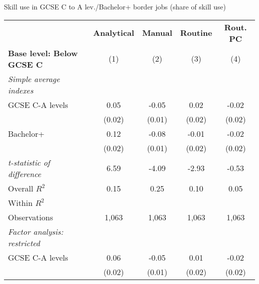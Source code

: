 \begin{center}
\begin{threeparttable}[!h]
\caption{Skill use in GCSE C to A lev./Bachelor+ border jobs (share of skill use)}
\label{tab:skillRegs}
\begin{tabular}{lcccc}
\toprule
\toprule
&\multicolumn{1}{c}{\textbf{Analytical}}&\multicolumn{1}{c}{\textbf{Manual}}&\multicolumn{1}{c}{\textbf{Routine}}&\multicolumn{1}{c}{\textbf{Rout. PC}} \\
\textbf{Base level: Below GCSE C}&\multicolumn{1}{c}{(1)}&\multicolumn{1}{c}{(2)}&\multicolumn{1}{c}{(3)}&\multicolumn{1}{c}{(4)} \\
\midrule
\textit{Simple average indexes}\vspace{1mm} \\ 
\hspace{3mm}GCSE C-A levels&        0.05\sym{**} &       -0.05\sym{***}&        0.02         &       -0.02         \\
                    &      (0.02)         &      (0.01)         &      (0.02)         &      (0.02)         \\
\hspace{3mm}Bachelor+&        0.12\sym{***}&       -0.08\sym{***}&       -0.01         &       -0.02         \\
                    &      (0.02)         &      (0.01)         &      (0.02)         &      (0.02)         \\
\textit{t-statistic of difference}&        6.59         &       -4.09         &       -2.93         &       -0.53         \\
\midrule Overall $ R^2$&        0.15         &        0.25         &        0.10         &        0.05         \\
Within $ R^2$       &                     &                     &                     &                     \\
Observations        &       1,063         &       1,063         &       1,063         &       1,063         \\
\midrule \vspace{1mm}\textit{Factor analysis: restricted} \\ 
\hspace{3mm}GCSE C-A levels&        0.06\sym{***}&       -0.05\sym{***}&        0.01         &       -0.02         \\
                    &      (0.02)         &      (0.01)         &      (0.02)         &      (0.02)         \\

\end{tabular}
\end{threeparttable}
\end{center}
